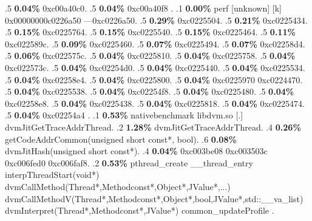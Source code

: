 \begin{profile}
{.5 \textbf{0.04\%} 0xc00a40c0. 
.5 \textbf{0.04\%} 0xc00a40f8\newline {} . 
.1 \textbf{ 0.00\%} perf             [unknown]              [k] 0x00000000c0226a50\newline {} ---0xc0226a50. 
.5 \textbf{0.29\%} 0xc0225504. 
.5 \textbf{0.21\%} 0xc0225434. 
.5 \textbf{0.15\%} 0xc0225764. 
.5 \textbf{0.15\%} 0xc0225540. 
.5 \textbf{0.15\%} 0xc0225464. 
.5 \textbf{0.11\%} 0xc022589c. 
.5 \textbf{0.09\%} 0xc0225460. 
.5 \textbf{0.07\%} 0xc0225494. 
.5 \textbf{0.07\%} 0xc02258d4. 
.5 \textbf{0.06\%} 0xc022575c. 
.5 \textbf{0.04\%} 0xc0225810. 
.5 \textbf{0.04\%} 0xc0225758. 
.5 \textbf{0.04\%} 0xc022573c. 
.5 \textbf{0.04\%} 0xc02254d0. 
.5 \textbf{0.04\%} 0xc0225440. 
.5 \textbf{0.04\%} 0xc0225534. 
.5 \textbf{0.04\%} 0xc02258e4. 
.5 \textbf{0.04\%} 0xc0225800. 
.5 \textbf{0.04\%} 0xc0225970\newline {} 0xc0224470. 
.5 \textbf{0.04\%} 0xc0225538. 
.5 \textbf{0.04\%} 0xc02254f8. 
.5 \textbf{0.04\%} 0xc0225480. 
.5 \textbf{0.04\%} 0xc02258e8. 
.5 \textbf{0.04\%} 0xc0225438. 
.5 \textbf{0.04\%} 0xc0225818. 
.5 \textbf{0.04\%} 0xc0225474. 
.5 \textbf{0.04\%} 0xc02254a4\newline {} . 
.1 \textbf{ 0.53\%} nativebenchmark  libdvm.so              [.] dvmJitGetTraceAddrThread. 
.2 \textbf{1.28\%} dvmJitGetTraceAddrThread. 
.4 \textbf{0.26\%} getCodeAddrCommon(unsigned short const*, bool). 
.6 \textbf{0.08\%} dvmJitHash(unsigned short const*). 
.4 \textbf{0.04\%} 0xc003be08\newline {} 0xc003503c\newline {} 0xc006fed0\newline {} 0xc006faf8. 
.2 \textbf{0.53\%} pthread\_create\newline {} \_\_thread\_entry\newline {} interpThreadStart(void*)\newline {} dvmCallMethod(Thread*,Methodconst*,Object*,JValue*,...)\newline {} dvmCallMethodV(Thread*,Methodconst*,Object*,bool,JValue*,std::\_\_va\_list)\newline {} dvmInterpret(Thread*,Methodconst*,JValue*)\newline {} common\_updateProfile\newline {} . 
}
\end{profile}

